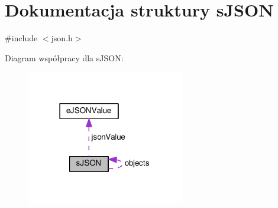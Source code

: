 \hypertarget{structsJSON}{}\section{Dokumentacja struktury s\+J\+S\+ON}
\label{structsJSON}


{\ttfamily \#include $<$json.\+h$>$}



Diagram współpracy dla s\+J\+S\+ON\+:\nopagebreak
\begin{figure}[H]
\begin{center}
\leavevmode
\includegraphics[width=195pt]{structsJSON__coll__graph}
\end{center}
\end{figure}
